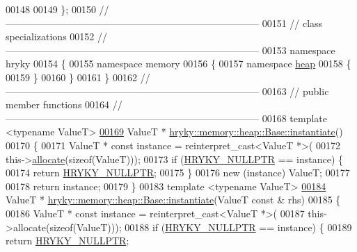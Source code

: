\begin{DoxyCode}
00148 
00149 \};
00150 \textcolor{comment}{//
      ------------------------------------------------------------------------------}
00151 \textcolor{comment}{// class specializations}
00152 \textcolor{comment}{//
      ------------------------------------------------------------------------------}
00153 \textcolor{keyword}{namespace }hryky
00154 \{
00155 \textcolor{keyword}{namespace }memory
00156 \{
00157 \textcolor{keyword}{namespace }\hyperlink{namespacehryky_1_1memory_1_1global_a6fc6103f67c837aa0f39b359588409cd}{heap}
00158 \{
00159 \}
00160 \}
00161 \}
00162 \textcolor{comment}{//
      ------------------------------------------------------------------------------}
00163 \textcolor{comment}{// public member functions}
00164 \textcolor{comment}{//
      ------------------------------------------------------------------------------}
00168 \textcolor{comment}{}\textcolor{keyword}{template} <\textcolor{keyword}{typename} ValueT>
\hypertarget{memory__heap__base_8h_source_l00169}{}\hyperlink{classhryky_1_1memory_1_1heap_1_1_base_a147663574da9f0202cbfbc139358ae6b}{00169} ValueT * \hyperlink{classhryky_1_1memory_1_1heap_1_1_base_a147663574da9f0202cbfbc139358ae6b}{hryky::memory::heap::Base::instantiate}()
00170 \{
00171     ValueT * \textcolor{keyword}{const} instance = \textcolor{keyword}{reinterpret\_cast<}ValueT *\textcolor{keyword}{>}(
00172         this->\hyperlink{classhryky_1_1memory_1_1heap_1_1_base_a068b1ee5b4e759df5e19dff37eecaf92}{allocate}(\textcolor{keyword}{sizeof}(ValueT)));
00173     \textcolor{keywordflow}{if} (\hyperlink{common_8h_a4cd4ac09cfcdbd6b30ee69afc156e210}{HRYKY_NULLPTR} == instance) \{
00174         \textcolor{keywordflow}{return} \hyperlink{common_8h_a4cd4ac09cfcdbd6b30ee69afc156e210}{HRYKY_NULLPTR};
00175     \}
00176     \textcolor{keyword}{new} (instance) ValueT;
00177     
00178     \textcolor{keywordflow}{return} instance;
00179 \}
00183 \textcolor{keyword}{template} <\textcolor{keyword}{typename} ValueT>
\hypertarget{memory__heap__base_8h_source_l00184}{}\hyperlink{classhryky_1_1memory_1_1heap_1_1_base_a7faca1782110d1dc7089caaede624444}{00184} ValueT * \hyperlink{namespacehryky_a7e731db6d90571cf1aea6e113d43b6ad}{hryky::memory::heap::Base::instantiate}(ValueT \textcolor{keyword}{const} & rhs)
00185 \{
00186     ValueT * \textcolor{keyword}{const} instance = \textcolor{keyword}{reinterpret\_cast<}ValueT *\textcolor{keyword}{>}(
00187         this->allocate(\textcolor{keyword}{sizeof}(ValueT)));
00188     \textcolor{keywordflow}{if} (\hyperlink{common_8h_a4cd4ac09cfcdbd6b30ee69afc156e210}{HRYKY_NULLPTR} == instance) \{
00189         \textcolor{keywordflow}{return} \hyperlink{common_8h_a4cd4ac09cfcdbd6b30ee69afc156e210}{HRYKY_NULLPTR};

\end{DoxyCode}

